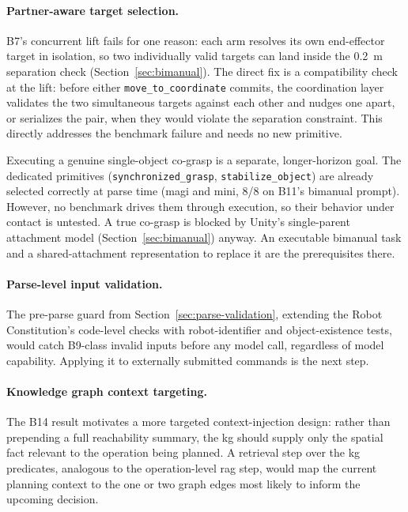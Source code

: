 \documentclass[
     12pt,
     a4paper,
     BCOR=10mm,
     DIV=14,
     listof=totoc,
     bibliography=totoc,
     parskip,
     twoside,
     headsepline
     ]{scrreprt}
\begin{document}
\paragraph{Partner-aware target selection.} B7's concurrent lift fails for one reason: each arm resolves its own end-effector target in isolation, so two individually valid targets can land inside the 0.2~m separation check (Section~\ref{sec:bimanual}). The direct fix is a compatibility check at the lift: before either \texttt{move\_to\_coordinate} commits, the coordination layer validates the two simultaneous targets against each other and nudges one apart, or serializes the pair, when they would violate the separation constraint. This directly addresses the benchmark failure and needs no new primitive.

Executing a genuine single-object co-grasp is a separate, longer-horizon goal. The dedicated primitives (\texttt{synchronized\_grasp}, \texttt{stabilize\_object}) are already selected correctly at parse time (\gls{magi} and \gls{mini}, 8/8 on B11's bimanual prompt). However, no benchmark drives them through execution, so their behavior under contact is untested. A true co-grasp is blocked by Unity's single-parent attachment model (Section~\ref{sec:bimanual}) anyway. An executable bimanual task and a shared-attachment representation to replace it are the prerequisites there.

\paragraph{Parse-level input validation.} The pre-parse guard from Section~\ref{sec:parse-validation}, extending the Robot Constitution's code-level checks with robot-identifier and object-existence tests, would catch B9-class invalid inputs before any model call, regardless of model capability. Applying it to externally submitted commands is the next step.

\paragraph{Knowledge graph context targeting.} The B14 result motivates a more targeted context-injection design: rather than prepending a full reachability summary, the \gls{kg} should supply only the spatial fact relevant to the operation being planned. A retrieval step over the \gls{kg} predicates, analogous to the operation-level \gls{rag} step, would map the current planning context to the one or two graph edges most likely to inform the upcoming decision.
\end{document}
